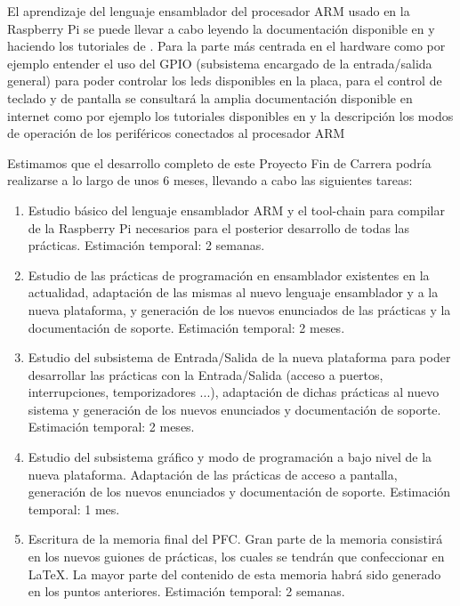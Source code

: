 El aprendizaje del lenguaje ensamblador del procesador ARM usado en la Raspberry Pi
se puede llevar a cabo leyendo la documentación disponible en \cite{DATH}
y haciendo los tutoriales de \cite{TASM}.
Para la parte más centrada en el hardware como por ejemplo entender el uso del GPIO
(subsistema encargado de la entrada/salida general) para poder controlar los leds
disponibles en la placa, para el control de teclado y de pantalla se consultará la
amplia documentación disponible en internet como por ejemplo los tutoriales disponibles en
\cite{BKPI}
y la descripción los modos de operación de los periféricos conectados al procesador ARM
\cite{ARMP}

Estimamos que el desarrollo completo de este Proyecto Fin de Carrera podría realizarse
a lo largo de unos 6 meses, llevando a cabo las siguientes tareas:

\begin{enumerate}
  \item Estudio básico del lenguaje ensamblador ARM y el tool-chain para compilar de la
        Raspberry Pi necesarios para el posterior desarrollo de todas las prácticas. 
        Estimación temporal: 2 semanas.

  \item Estudio de las prácticas de programación en ensamblador existentes en la actualidad,
        adaptación de las mismas al nuevo lenguaje ensamblador y a la nueva plataforma,
        y generación de los nuevos enunciados de las prácticas y la documentación de soporte. 
        Estimación temporal: 2 meses.

  \item Estudio del subsistema de Entrada/Salida de la nueva plataforma para poder desarrollar
        las prácticas con la Entrada/Salida (acceso a puertos, interrupciones, temporizadores
        ...), adaptación de dichas prácticas al nuevo sistema y generación de los nuevos
        enunciados y documentación de soporte. 
        Estimación temporal: 2 meses.

  \item Estudio del subsistema gráfico y modo de programación a bajo nivel de la nueva
        plataforma. Adaptación de las prácticas de acceso a pantalla, generación de los
        nuevos enunciados y documentación de soporte. 
        Estimación temporal: 1 mes.

  \item Escritura de la memoria final del PFC. Gran parte de la memoria consistirá en los
        nuevos guiones de prácticas, los cuales se tendrán que confeccionar en LaTeX. La
        mayor parte del contenido de esta memoria habrá sido generado en los puntos anteriores.
        Estimación temporal: 2 semanas.
\end{enumerate}

